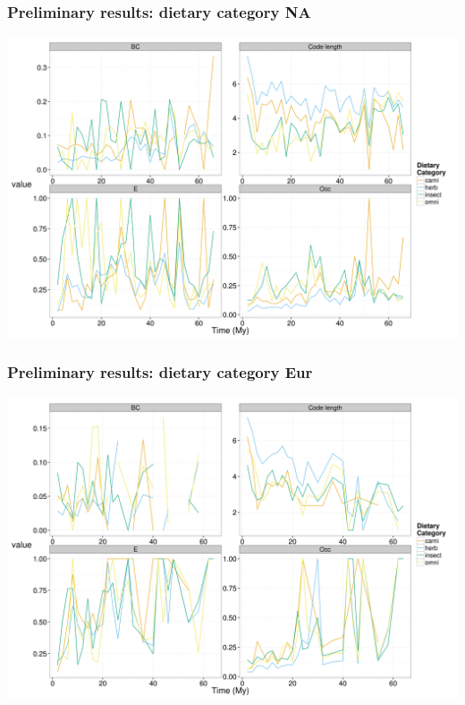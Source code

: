\documentclass{beamer}
\begin{document}
\begin{frame}
  \frametitle{Preliminary results: dietary category NA}

  \begin{center}
    \includegraphics[height = 0.8\textheight, width = \textwidth, keepaspectratio = true]{figure/na_dt}
  \end{center}
\end{frame}

\begin{frame}
  \frametitle{Preliminary results: dietary category Eur}

  \begin{center}
    \includegraphics[height = 0.8\textheight, width = \textwidth, keepaspectratio = true]{figure/er_dt}
  \end{center}
\end{frame}
\end{document}
